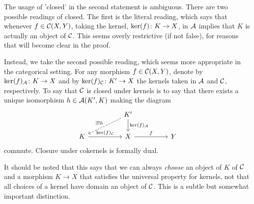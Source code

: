 \documentclass[reqno, 12pt]{amsart}
\begin{document}
\begin{remark}
  The usage of 'closed' in the second statement is ambiguous.
  There are two possible readings of closed.
  The first is the literal reading, which says that whenever $f \in \mathcal{C}(X,Y)$, taking the kernel, $\operatorname{ker}(f) \colon K \to X$, in $\mathcal{A}$ implies that $K$ is actually an object of $\mathcal{C}$.
  This seems overly restrictive (if not false), for reasons that will become clear in the proof.

  Instead, we take the second possible reading, which seems more appropriate in the categorical setting.
  For any morphism $f \in \mathcal{C}(X,Y)$, denote by $\operatorname{ker}(f)_{\mathcal{A}} \colon K \to X$ and by $\operatorname{ker}(f)_{\mathcal{C}} \colon K^\prime \to X$ the kernels taken in $\mathcal{A}$ and $\mathcal{C}$, respectively.
  To say that $\mathcal{C}$ is closed under kernels is to say that there exists a unique isomorphism $h \in \mathcal{A}(K^\prime,K)$ making the diagram
  $$\begin{tikzcd}[column sep=huge]
      & K^\prime \arrow{d}{\op{ker}(f)_\A}\arrow[dashed,swap]{ld}{\exists !h}\\
      K \arrow{r}{\op{ker}(f)_\C} & X \arrow{r}{f} & Y
  \end{tikzcd}$$
  commute.
  Closure under cokernels is formally dual.

  It should be noted that this says that we can always \emph{choose} an object of $K$ of $\mathcal{C}$ and a morphism $K \to X$ that satisfies the universal property for kernels, not that all choices of a kernel have domain an object of $\mathcal{C}$.
  This is a subtle but somewhat important distinction.
\end{remark}
\end{document}

